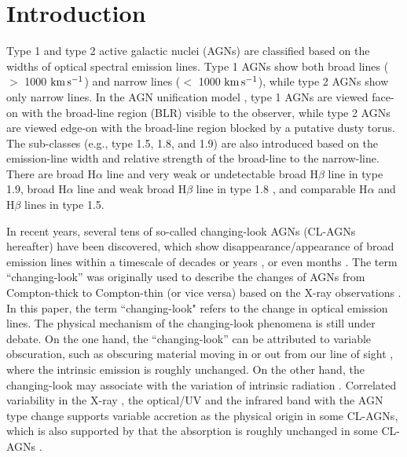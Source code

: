 \section{Introduction}\label{sec:intro}

Type 1 and type 2 active galactic nuclei (AGNs) are classified based on the widths of optical spectral emission lines. Type 1 AGNs show both broad lines ($>$ 1000 $ \rm{km}\, \rm{s}^{-1}$) and narrow lines ($<$ 1000 $ \rm{km}\, \rm{s}^{-1}$), while type 2 AGNs show only narrow lines. In the AGN unification model \citep[e.g.][]{1993ARA&A..31..473A}, type 1 AGNs are viewed face-on with the broad-line region (BLR) visible to the observer, while type 2 AGNs are viewed edge-on with the broad-line region blocked by a putative dusty torus. The sub-classes (e.g., type 1.5, 1.8, and 1.9) are also introduced \citep[see ][]{1976MNRAS.176P..61O,1981ApJ...249..462O} based on the emission-line width and relative strength of the broad-line to the narrow-line. There are broad H$\alpha$ line and very weak or undetectable broad H$\beta$ line in type 1.9, broad H$\alpha$ line and weak broad H$\beta$ line in type 1.8 \citep[see][]{1986ApJ...311..135C}, and comparable H$\alpha$ and H$\beta$ lines in type 1.5.  

In recent years, several tens of so-called changing-look AGNs (CL-AGNs hereafter) have been discovered,  which show disappearance/appearance of broad emission lines within a timescale of decades or years \citep[e.g.][]{2014ApJ...796..134D,2014ApJ...788...48S,2015ApJ...800..144L,2016A&A...593L...8M,2016MNRAS.461.1927P,2016ApJ...826..188R,2018ApJ...862..109Y,2019MNRAS.486..123R,2020MNRAS.491.4925G,2020ApJ...890L..29A,2020ApJ...901....1W,2020A&A...638A..91K}, or even months \citep[e.g.][]{2019MNRAS.487.4057K,2019ApJ...883...94T}. The term ``changing-look'' was originally used to describe the changes of AGNs from Compton-thick to Compton-thin (or vice versa) based on the X-ray observations \citep[e.g.][]{2003MNRAS.342..422M}. In this paper, the term ``changing-look" refers to the change in optical emission lines. The physical mechanism of the changing-look phenomena is still under debate. On the one hand, the ``changing-look'' can be attributed to variable obscuration, such as obscuring material moving in or out from our line of sight \citep[e.g.][]{2013MNRAS.436.1615M,2014MNRAS.443.2862A,2015ApJ...815...55R,2018MNRAS.481.2470T}, where the intrinsic emission is roughly unchanged. On the other hand, the changing-look may associate with the variation of intrinsic radiation \citep[e.g., the change of accretion disk，][]{1984MNRAS.211P..33P,2014MNRAS.438.3340E}. Correlated variability in the X-ray \citep[e.g.][]{2016MNRAS.461.1927P,2019MNRAS.483L..88P,2020ApJ...898L...1R}, the optical/UV \citep[e.g.][]{2019ApJ...885...44D} and the infrared band \citep[e.g.][]{2017ApJ...846L...7S,2018ApJ...864...27S} with the AGN type change supports variable accretion as the physical origin in some CL-AGNs, which is also supported by that the absorption is roughly unchanged in some CL-AGNs \citep[e.g.][]{2016A&A...593L...9H,2020ApJ...890L..29A,2020ApJ...901....1W}. 

